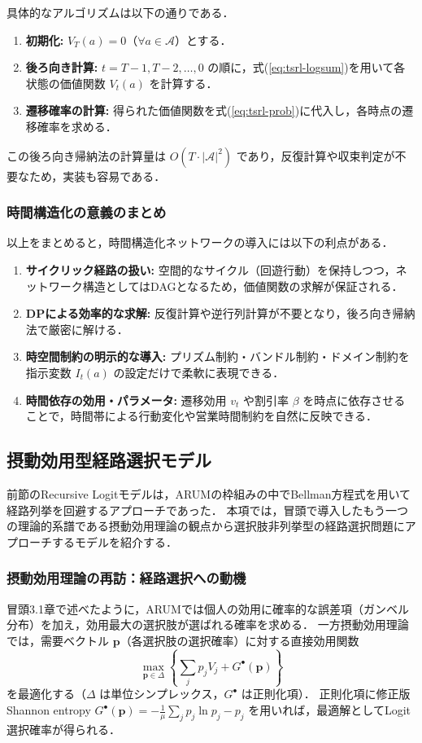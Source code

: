 具体的なアルゴリズムは以下の通りである．
\begin{enumerate}
  \item \textbf{初期化:} $V_T(a) = 0$（$\forall a \in \mathcal{A}$）とする．
  \item \textbf{後ろ向き計算:} $t = T-1, T-2, \ldots, 0$ の順に，式(\ref{eq:tsrl-logsum})を用いて各状態の価値関数 $V_t(a)$ を計算する．
  \item \textbf{遷移確率の計算:} 得られた価値関数を式(\ref{eq:tsrl-prob})に代入し，各時点の遷移確率を求める．
\end{enumerate}
この後ろ向き帰納法の計算量は $O(T \cdot |\mathcal{A}|^2)$ であり，反復計算や収束判定が不要なため，実装も容易である．

\subsubsection{時間構造化の意義のまとめ}
以上をまとめると，時間構造化ネットワークの導入には以下の利点がある．
\begin{enumerate}
  \item \textbf{サイクリック経路の扱い:} 空間的なサイクル（回遊行動）を保持しつつ，ネットワーク構造としてはDAGとなるため，価値関数の求解が保証される．
  \item \textbf{DPによる効率的な求解:} 反復計算や逆行列計算が不要となり，後ろ向き帰納法で厳密に解ける．
  \item \textbf{時空間制約の明示的な導入:} プリズム制約・バンドル制約・ドメイン制約を指示変数 $I_t(a)$ の設定だけで柔軟に表現できる．
  \item \textbf{時間依存の効用・パラメータ:} 遷移効用 $v_t$ や割引率 $\beta$ を時点に依存させることで，時間帯による行動変化や営業時間制約を自然に反映できる．
\end{enumerate}


\subsection{摂動効用型経路選択モデル}\label{ssec:purc}
前節のRecursive Logitモデルは，ARUMの枠組みの中でBellman方程式を用いて経路列挙を回避するアプローチであった．
本項では，冒頭で導入したもう一つの理論的系譜である摂動効用理論の観点から選択肢非列挙型の経路選択問題にアプローチするモデルを紹介する．

\subsubsection{摂動効用理論の再訪：経路選択への動機}
冒頭3.1章で述べたように，ARUMでは個人の効用に確率的な誤差項（ガンベル分布）を加え，効用最大の選択肢が選ばれる確率を求める．
一方摂動効用理論では，需要ベクトル $\bm{p}$（各選択肢の選択確率）に対する直接効用関数
\begin{equation}
  \max_{\bm{p} \in \Delta} \left\{ \sum_{j} p_j V_j + G^\bullet(\bm{p}) \right\}
\end{equation}
を最適化する（$\Delta$ は単位シンプレックス，$G^\bullet$ は正則化項）．
正則化項に修正版Shannon entropy $G^\bullet(\bm{p}) = -\frac{1}{\mu}\sum_j p_j \ln p_j - p_j$ を用いれば，最適解としてLogit選択確率が得られる．

